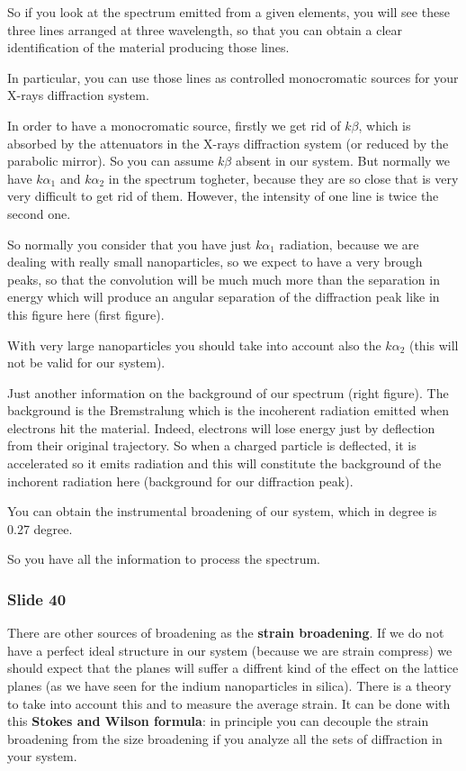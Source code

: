 \documentclass[../main/main.tex]{subfiles}
\begin{document}
So if you look at the spectrum emitted from a given elements, you will see these three lines arranged at three wavelength, so that you can obtain a clear identification of the material producing those lines.

In particular, you can use those lines as controlled monocromatic sources for your X-rays diffraction system.

In order to have a monocromatic source, firstly we get rid of \( k \beta  \), which is absorbed by the attenuators in the X-rays diffraction system (or reduced by the parabolic mirror). So you can assume \( k \beta  \) absent in our system. But normally we have \( k \alpha _1 \) and \( k \alpha _2 \) in the spectrum togheter, because they are so close that is very very difficult to get rid of them.
However, the intensity of one line is twice the second one.


So normally you consider that you have just \( k \alpha _1 \) radiation, because we are dealing with really small nanoparticles, so we expect to have a very brough peaks, so that the convolution will be much much more than the separation in energy which will produce an angular separation of the diffraction peak like in this figure here (first figure).

With very large nanoparticles you should take into account also the \( k \alpha _2 \) (this will not be valid for our system).

Just another information on the background of our spectrum (right figure). The background is the Bremstralung which is the incoherent radiation emitted when electrons hit the material. Indeed, electrons will lose energy just by deflection from their original trajectory. So when a charged particle is deflected, it is accelerated so it emits radiation and this will constitute the background of the inchorent radiation here (background for our diffraction peak).

You can obtain the instrumental broadening of our system, which in degree is 0.27 degree.

So you have all the information to process the spectrum.

\subsubsection{Slide 40}
There are other sources of broadening as the \textbf{strain broadening}. If we do not have a perfect ideal structure in our system (because we are strain compress) we should expect that the planes will suffer a diffrent kind of the effect on the lattice planes (as we have seen for the indium nanoparticles in silica). There is a theory to take into account this and to measure the average strain. It can be done with this \textbf{Stokes and Wilson formula}: in principle you can decouple the strain broadening from the size broadening if you analyze all the sets of diffraction in your system.
\end{document}
